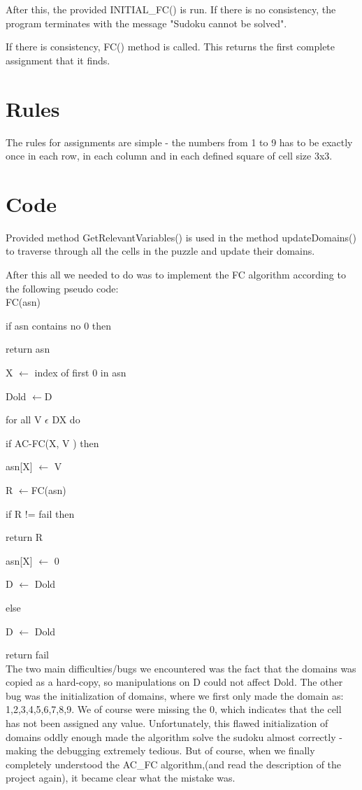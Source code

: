 After this, the provided INITIAL\_FC() is run. If there is no consistency, the program terminates with the message "Sudoku cannot be solved". 

If there is consistency, FC() method is called. This returns the first complete assignment that it finds. 


\section{Rules}
The rules for assignments are simple - the numbers from 1 to 9 has to be exactly once in each row, in each column and in each defined square of cell size 3x3.

\section{Code}
Provided method GetRelevantVariables() is used in the method updateDomains() to traverse through all the cells in the puzzle and update their domains.
\pagebreak

After this all we needed to do was to implement the FC algorithm according to the following pseudo code:\\

FC(asn)

if asn contains no 0 then 

return asn

X $\gets$ index of first 0 in asn

Dold $\gets$D

for all V  	$\epsilon$ DX do

if AC-FC(X, V ) then 

asn[X] $\gets$ V

R $\gets$FC(asn)

if R != fail then

return R

asn[X] $\gets$ 0

D $\gets$ Dold

else

D  	$\gets$  Dold

return fail\\

The two main difficulties/bugs we encountered was the fact that the domains was copied as a hard-copy, so manipulations on D could not affect Dold. The other bug was the initialization of domains, where we first only made the domain as: {1,2,3,4,5,6,7,8,9}.
We of course were missing the 0, which indicates that the cell has not been assigned any value. 
Unfortunately, this flawed initialization of domains oddly enough made the algorithm solve the sudoku almost correctly - making the debugging extremely tedious. But of course, when we finally completely understood the AC\_FC algorithm,(and read the description of the project again), it became clear what the mistake was.


